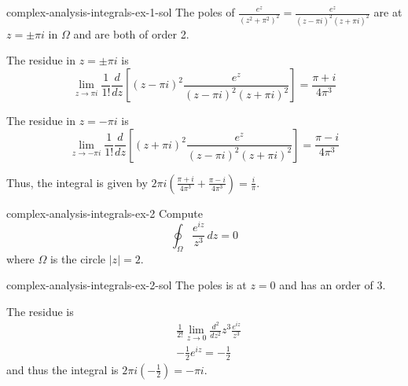 \documentclass[preview]{standalone}
\begin{document}
\begin{snippetsolution}{complex-analysis-integrals-ex-1-sol}{}
    The poles of \(\frac{e^z}{{(z^2 + \pi^2)}^2} = \frac{e^z}{(z-\pi i)^2(z+\pi i)^2}\)
    are at \(z=\pm \pi i\) in \(\Omega\) and are both of order 2.

    The residue in \(z=\pm \pi i\) is
    \[ \lim_{z \to \pi i} \frac{1}{1!} \frac{d}{dz} \left[
        (z - \pi i)^2 \frac{e^z}{(z-\pi i)^2(z+\pi i)^2}
    \right] = \frac{\pi + i}{4\pi^3}\]

    The residue in \(z=-\pi i\) is
    \[ \lim_{z \to -\pi i} \frac{1}{1!} \frac{d}{dz} \left[
        (z + \pi i)^2 \frac{e^z}{(z-\pi i)^2(z+\pi i)^2}
    \right] = \frac{\pi - i}{4\pi^3}\]

    Thus, the integral is given by \(2\pi i \left( \frac{\pi + i}{4\pi^3} + \frac{\pi - i}{4\pi^3} \right) = \frac{i}{\pi}\).
\end{snippetsolution}

\begin{snippetexercise}{complex-analysis-integrals-ex-2}{}
    Compute \[ \oint_\Omega \frac{e^{iz}}{z^3} \,dz = 0 \]
    where \(\Omega\) is the circle \(|z|=2\).
\end{snippetexercise}

\begin{snippetsolution}{complex-analysis-integrals-ex-2-sol}{}
    The poles is at \(z=0\) and has an order of 3.

    The residue is
    \begin{align*}
        & \frac{1}{2!} \lim_{z \to 0} \frac{d^2}{dz^2} z^3 \frac{e^{iz}}{z^3} \\
        &-\frac{1}{2} e^{iz} = -\frac{1}{2}
    \end{align*}
    and thus the integral is \(2\pi i (-\frac{1}{2}) = -\pi i\).
\end{snippetsolution}
\end{document}
